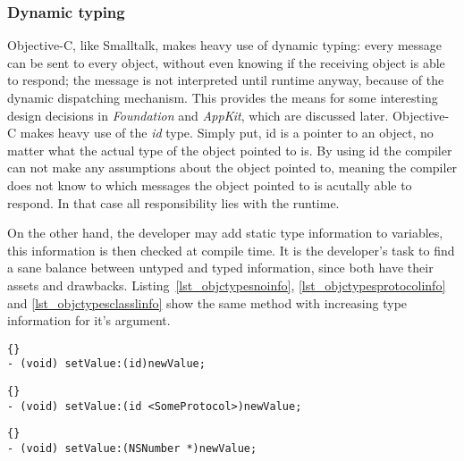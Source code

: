 \subsubsection{Dynamic typing}
Objective-C, like Smalltalk, makes heavy use of dynamic typing: every message
can be sent to every object, without even knowing if the receiving object is
able to respond; the message is not interpreted until runtime anyway, because
of the dynamic dispatching mechanism. This provides the means for some
interesting design decisions in \textit{Foundation} and \textit{AppKit}, which
are discussed later. 
Objective-C makes heavy use of the \textit{id} type. Simply put, id is a pointer
to an object, no matter what the actual type of the object pointed to is. By
using id the compiler can not make any assumptions about the object pointed to,
meaning the compiler does not know to which messages the object pointed to is
acutally able to respond. In that case all responsibility lies with the runtime.

On the other hand, the developer may add static type information to variables,
this information is then checked at compile time. It is the developer's task to
find a sane balance between untyped and typed information, since both have their
assets and drawbacks. Listing~\ref{lst_objctypesnoinfo},
\ref{lst_objctypesprotocolinfo} and \ref{lst_objctypesclasslinfo} show the same
method with increasing type information for it's argument.

\begin{lstlisting}[captionpos=b, caption=Argument without type information.,
label=lst_objctypesnoinfo]{}
- (void) setValue:(id)newValue;
\end{lstlisting}

\begin{lstlisting}[captionpos=b, caption=Argument with protocol type
information.,
label=lst_objctypesprotocolinfo]{}
- (void) setValue:(id <SomeProtocol>)newValue;
\end{lstlisting}

\begin{lstlisting}[captionpos=b, caption=Argument with class type information.,
label=lst_objctypesclasslinfo]{}
- (void) setValue:(NSNumber *)newValue;
\end{lstlisting}

